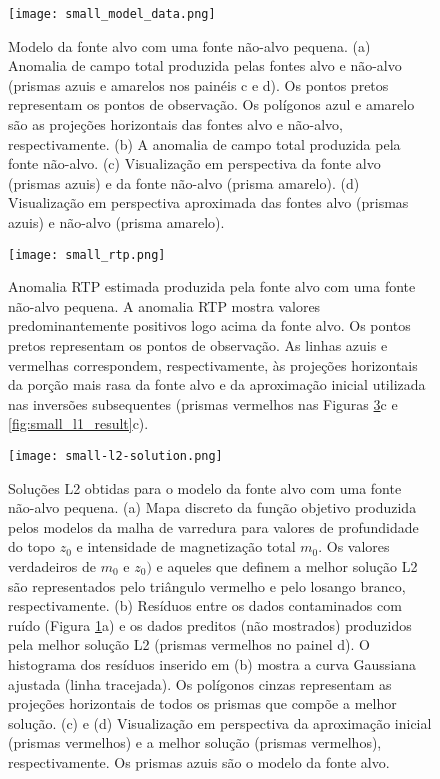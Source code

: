 \pagebreak
\begin{figure}[!htb]
	\centering
	\texttt{[image: small\_model\_data.png]}
	\caption{Modelo da fonte alvo com uma fonte não-alvo pequena.
		(a) Anomalia de campo total produzida pelas fontes alvo e não-alvo
		(prismas azuis e amarelos nos painéis c e d). Os pontos pretos representam os pontos de observação. Os polígonos azul e amarelo são as projeções horizontais das fontes alvo e não-alvo, respectivamente.
		(b) A anomalia de campo total produzida pela fonte não-alvo. 
		(c) Visualização em perspectiva da fonte alvo (prismas azuis) e da fonte não-alvo (prisma amarelo). 
		(d) Visualização em perspectiva aproximada das fontes alvo (prismas azuis) e não-alvo (prisma amarelo).
	}
	\label{fig:small_model}
\end{figure}
\pagebreak
\begin{figure}[!htb]
	\centering
	\texttt{[image: small\_rtp.png]}
	\caption{Anomalia RTP estimada produzida pela fonte alvo com uma fonte não-alvo pequena. 
		A anomalia RTP mostra valores predominantemente positivos logo acima da fonte alvo. Os pontos pretos representam os pontos de observação. As linhas azuis e vermelhas correspondem, respectivamente, às projeções horizontais da porção mais rasa da fonte alvo e da aproximação inicial utilizada nas inversões subsequentes (prismas vermelhos nas Figuras \ref{fig:small_l2_result}c e 
		\ref{fig:small_l1_result}c).
	}
	\label{fig:small_model_rtp}
\end{figure}
\pagebreak
\begin{figure}[!htb]
	\centering
	\texttt{[image: small-l2-solution.png]}
	\caption{Soluções L2 obtidas para o modelo da fonte alvo com uma fonte não-alvo pequena. 
		(a) Mapa discreto da função objetivo produzida pelos modelos da malha de varredura para valores de profundidade do topo $z_{0}$ e intensidade de magnetização total $m_{0}$. 
		Os valores verdadeiros de $m_{0}$ e $z_{0})$ e aqueles que definem a melhor solução L2 são representados pelo triângulo vermelho e pelo losango branco, respectivamente.
		(b) Resíduos entre os dados contaminados com ruído (Figura \ref{fig:small_model}a) 
		e os dados preditos (não mostrados) produzidos pela melhor solução L2 (prismas vermelhos no painel d). 
		O histograma dos resíduos inserido em (b) mostra a curva Gaussiana ajustada (linha tracejada).
		Os polígonos cinzas representam as projeções horizontais de todos os prismas que compõe a melhor solução. 
		(c) e (d) Visualização em perspectiva da aproximação inicial (prismas vermelhos) e 
		a melhor solução (prismas vermelhos), respectivamente. Os prismas azuis são o modelo da fonte alvo.
	}
	\label{fig:small_l2_result}
\end{figure}
